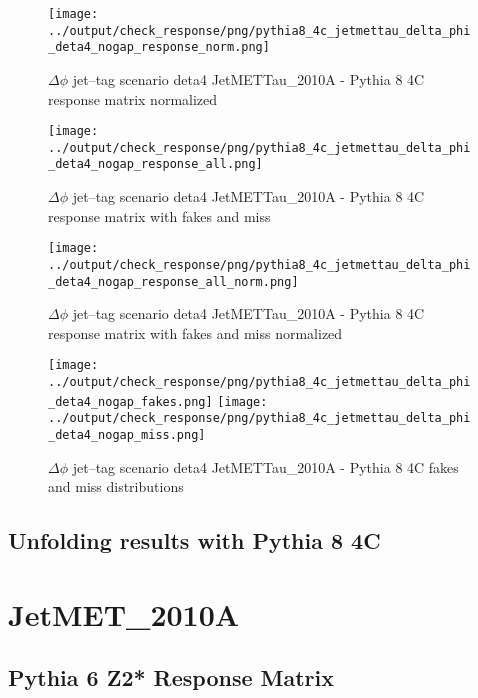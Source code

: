\documentclass[11pt]{book}
\begin{document}
\begin{figure}[ht]
\centering
\texttt{[image: ../output/check\_response/png/pythia8\_4c\_jetmettau\_delta\_phi\_deta4\_nogap\_response\_norm.png]}
\caption{$\Delta\phi$ jet--tag scenario deta4 JetMETTau\_2010A - Pythia 8 4C response matrix normalized}
\label{p8_jetmettau_delta_phi_deta4_nogap_response_norm}
\end{figure}

\begin{figure}[ht]
\centering
\texttt{[image: ../output/check\_response/png/pythia8\_4c\_jetmettau\_delta\_phi\_deta4\_nogap\_response\_all.png]}
\caption{$\Delta\phi$ jet--tag scenario deta4 JetMETTau\_2010A - Pythia 8 4C response matrix with fakes and miss}
\label{p8_jetmettau_delta_phi_deta4_nogap_response_all}
\end{figure}

\begin{figure}[ht]
\centering
\texttt{[image: ../output/check\_response/png/pythia8\_4c\_jetmettau\_delta\_phi\_deta4\_nogap\_response\_all\_norm.png]}
\caption{$\Delta\phi$ jet--tag scenario deta4 JetMETTau\_2010A - Pythia 8 4C response matrix with fakes and miss normalized}
\label{p8_jetmettau_delta_phi_deta4_nogap_response_all_norm}
\end{figure}

\begin{figure}[ht]
\centering
\texttt{[image: ../output/check\_response/png/pythia8\_4c\_jetmettau\_delta\_phi\_deta4\_nogap\_fakes.png]}
\texttt{[image: ../output/check\_response/png/pythia8\_4c\_jetmettau\_delta\_phi\_deta4\_nogap\_miss.png]}
\caption{$\Delta\phi$ jet--tag scenario deta4 JetMETTau\_2010A - Pythia 8 4C fakes and miss distributions}
\label{p8_jetmettau_delta_phi_deta4_nogap_fakesmiss}
\end{figure}


\clearpage
\subsection{Unfolding results with Pythia 8 4C}


\section{JetMET\_2010A}
\subsection{Pythia 6 Z2* Response Matrix}
\end{document}
